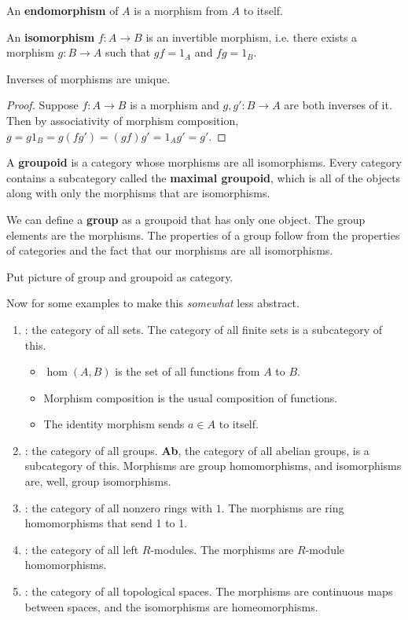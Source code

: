\documentclass[twoside,10pt]{report}
\begin{document}
\begin{defn}
An \textbf{endomorphism} of $A$ is a morphism from $A$ to itself.
\end{defn}

\begin{defn}
	An \textbf{isomorphism} $f:A\to B$ is an invertible morphism, i.e. there exists a morphism $g:B\to A$ such that $gf=1_{A}$ and $fg=1_{B}$.
\end{defn}

\begin{prop}
Inverses of morphisms are unique.
\end{prop}
\begin{proof}
Suppose $f:A \to B$ is a morphism and $g,g': B \to A$ are both inverses of it. Then by associativity of morphism composition, $g=g1_{B}=g(fg')=(gf)g'=1_{A}g'=g'.$
\end{proof}

\begin{defn}[]
A \textbf{groupoid} is a category whose morphisms are all isomorphisms. Every category contains a subcategory called the \textbf{maximal groupoid}, which is all of the objects along with only the morphisms that are isomorphisms.
\end{defn}

\begin{ex}[]
	We can define a \textbf{group} as a groupoid that has only one object. The group elements are the morphisms. The properties of a group follow from the properties of categories and the fact that our morphisms are all isomorphisms.
\end{ex}

{\color{red}Put picture of group and groupoid as category.}

Now for some examples to make this \textit{somewhat} less abstract.

\begin{enumerate}
	\item {}: the category of all sets. The category of all finite sets is a subcategory of this.
		\begin{itemize}
			\item $\hom(A,B)$ is the set of all functions from $A$ to $B$.
			\item Morphism composition is the usual composition of functions.
			\item The identity morphism sends $a \in A$ to itself.
		\end{itemize}
	\item {}: the category of all groups. \textbf{Ab}, the category of all abelian groups, is a subcategory of this. Morphisms are group homomorphisms, and isomorphisms are, well, group isomorphisms.
	\item {}: the category of all nonzero rings with $1$. The morphisms are ring homomorphisms that send 1 to 1.
	\item {}: the category of all left $R$-modules. The morphisms are $R$-module homomorphisms.
	\item {}: the category of all topological spaces. The morphisms are continuous maps between spaces, and the isomorphisms are homeomorphisms.
\end{enumerate}
\end{document}
